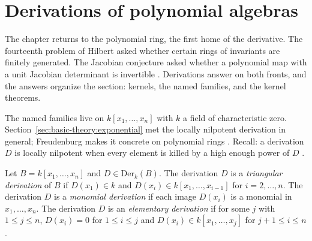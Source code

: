 \section{Derivations of polynomial algebras}\label{sec:polynomial-weyl:polynomial}

The chapter returns to the polynomial ring, the first home of the
derivative. The fourteenth problem of Hilbert asked whether certain rings of
invariants are finitely generated. The Jacobian conjecture asked whether a
polynomial map with a unit Jacobian determinant is invertible
\cite[p.~xii]{Freudenburg2017}. Derivations answer on both fronts, and
the answers organize the section: kernels, the named families, and the
kernel theorems.

The named families live on $k[x_{1},\dots,x_{n}]$ with $k$ a field of
characteristic zero. Section~\ref{sec:basic-theory:exponential} met the
locally nilpotent derivation in general; Freudenburg makes it concrete on
polynomial rings \cite[p.~76]{Freudenburg2017}. Recall: a derivation $D$
is locally nilpotent when every element is killed by a high enough power
of $D$ \cite[p.~21]{Freudenburg2017}. %

\begin{definition}\label{def:pw:triangular}
Let $B=k[x_{1},\dots,x_{n}]$ and $D\in\mathrm{Der}_{k}(B)$. The derivation
$D$ is a \emph{triangular derivation} of $B$ if $D(x_{1})\in k$ and
$D(x_{i})\in k[x_{1},\dots,x_{i-1}]$ for $i=2,\dots,n$. The derivation $D$
is a \emph{monomial derivation} if each image $D(x_{i})$ is a monomial in
$x_{1},\dots,x_{n}$. The derivation $D$ is an \emph{elementary derivation}
if for some $j$ with $1\leq j\leq n$, $D(x_{i})=0$ for $1\leq i\leq j$ and
$D(x_{i})\in k[x_{1},\dots,x_{j}]$ for $j+1\leq i\leq n$.
\end{definition}

